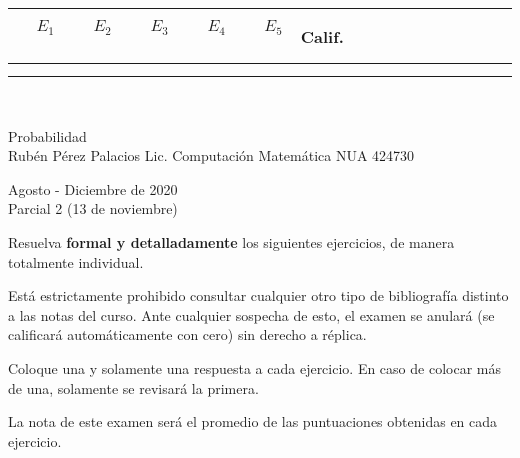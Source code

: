 \documentclass[10pt]{extarticle}
\begin{document}
 \begin{flushright}
  \begin{tabular}{|c|c|c|c|c|c|c|c|c|c|c|c|c|c|c|c|}
  \hline
  \ \ $E_1$\ \ &\ \ $E_2$\ \ &\ \ $E_3$\ \ &\ \ $E_4$\ \ &\ \ $E_5$\ \ &Calif.\\
  \hline
  & &  & & & \\
    & &  & & &\\
   \hline
 \end{tabular}\\
 \end{flushright}
\begin{center}
\large
Probabilidad\\
Rubén Pérez Palacios Lic. Computación Matemática NUA 424730
\normalsize

Agosto - Diciembre de 2020\\

Parcial 2 (13 de noviembre)
\end{center}

Resuelva \textbf{formal y detalladamente} los siguientes ejercicios, de manera totalmente individual.

Está estrictamente prohibido consultar cualquier otro tipo de bibliografía distinto a las notas del curso. Ante cualquier sospecha de esto, el examen se anulará (se calificará automáticamente con cero) sin derecho a réplica.

Coloque una y solamente una respuesta a cada ejercicio. En caso de colocar más de una, solamente se revisará la primera.

La nota de este examen será el promedio de las puntuaciones obtenidas en cada ejercicio.
\end{document}
